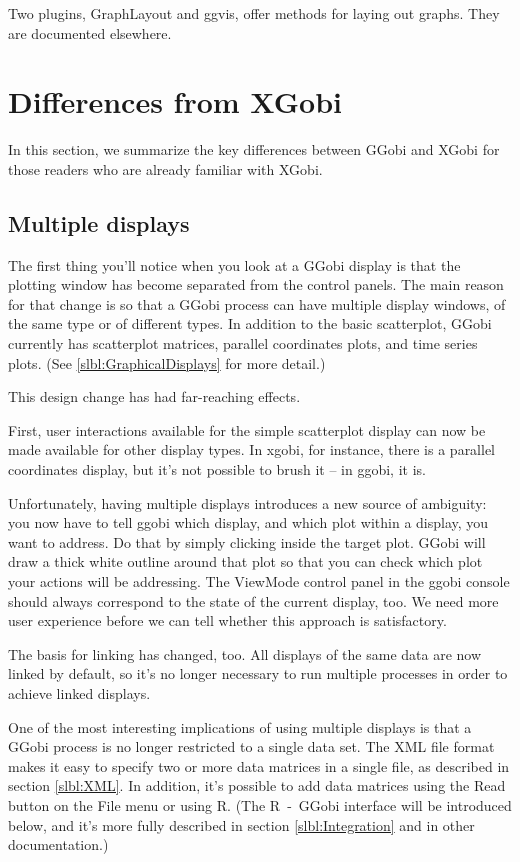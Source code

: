 \documentclass[11pt]{article}
\begin{document}
Two plugins, GraphLayout and ggvis, offer methods for laying out
graphs.  They are documented elsewhere.

\newpage
\section{Differences from XGobi}
\label{slbl:xgobi}

In this section, we summarize the key differences between GGobi
and XGobi for those readers who are already familiar with XGobi.

\subsection {Multiple displays}

The first thing you'll notice when you look at a GGobi display is
that the plotting window has become separated from the control
panels.  The main reason for that change is so that a GGobi process
can have multiple display windows, of the same type or of different
types.  In addition to the basic scatterplot, GGobi currently has
scatterplot matrices, parallel coordinates plots, and time series
plots.  (See \ref{slbl:GraphicalDisplays} for more detail.)

This design change has had far-reaching effects.

First, user interactions available for the simple scatterplot display
can now be made available for other display types.  In xgobi, for
instance, there is a parallel coordinates display, but it's not
possible to brush it -- in ggobi, it is.

Unfortunately, having multiple displays introduces a new source of
ambiguity: you now have to tell ggobi which display, and which plot
within a display, you want to address.  Do that by simply clicking
inside the target plot.  GGobi will draw a thick white outline around
that plot so that you can check which plot your actions will be
addressing.  The ViewMode control panel in the ggobi console should
always correspond to the state of the current display, too.  We need
more user experience before we can tell whether this approach is
satisfactory.

The basis for linking has changed, too.  All displays of the same data
are now linked by default, so it's no longer necessary to run
multiple processes in order to achieve linked displays.

One of the most interesting implications of using multiple displays
is that a GGobi process is no longer restricted to a single data
set.  The XML file format makes it easy to specify two or more data
matrices in a single file, as described in section \ref{slbl:XML}.
In addition, it's possible to add data matrices using the Read button
on the File menu or using R.  (The R~-~GGobi interface will be
introduced below, and it's more fully described in section
\ref{slbl:Integration} and in other documentation.)
\end{document}
